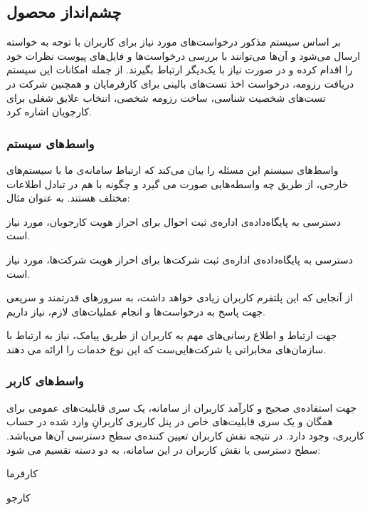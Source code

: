 \documentclass[12pt,svgnames,oneside]{book}
\newcounter{itemadded}
\let\LaTeXStandardEnumerateBegin\enumerate
\let\LaTeXStandardEnumerateEnd\endenumerate
\renewenvironment{enumerate}{%
\LaTeXStandardEnumerateBegin%
\setcounter{itemadded}{0}
}{%
\LaTeXStandardEnumerateEnd%
}%
\begin{document}
\subsection{چشم‌انداز محصول}
بر اساس سیستم مذکور درخواست‌های مورد نیاز برای کاربران با توجه به خواسته ارسال می‌شود و آن‌ها می‌توانند با بررسی درخواست‌ها و فایل‌های پیوست نظرات خود را اقدام کرده و در صورت نیاز با یک‌دیگر ارتباط بگیرند.
از جمله امکانات این سیستم دریافت رزومه، درخواست اخذ تست‌های بالینی برای کارفرمایان و همچنین شرکت در تست‌های شخصیت شناسی، ساخت رزومه شخصی، انتخاب علایق شغلی برای کارجویان اشاره کرد.

\subsubsection{واسط‌های سیستم}
واسط‌های سیستم این مسئله را بیان می‌کند که ارتباط سامانه‌ی ما با سیستم‌های خارجی، از طریق چه واسطه‌هایی صورت می گیرد و چگونه با هم در تبادل اطلاعات مختلف هستند. به عنوان مثال:
\begin{enumerate}
\item
	دسترسی به پایگاه‌داده‌ی اداره‌ی ثبت احوال برای احراز هویت کارجو‌یان، مورد نیاز است.
\item
	دسترسی به پایگاه‌داده‌ی اداره‌ی ثبت شرکت‌ها برای احراز هویت شرکت‌ها، مورد نیاز است.
\item
	از آنجایی که این پلتفرم کاربران زیادی خواهد داشت، به سرور‌های قدرتمند و سریعی جهت پاسخ به درخواست‌ها و انجام عملیات‌های لازم، نیاز داریم.
\item
	جهت ارتباط و اطلاع رسانی‌های مهم به کاربران از طریق پیامک، نیاز به ارتباط با سازمان‌های مخابراتی یا شرکت‌هایی‌ست که این نوع خدمات را ارائه می دهند.
\end{enumerate}

\subsubsection{واسط‌های کاربر}
جهت استفاده‌ی صحیح و کارآمد کاربران از سامانه، یک سری قابلیت‌های عمومی برای همگان و یک سری قابلیت‌های خاص در پنل کاربری کاربرانِ وارد شده در حساب کاربری، وجود دارد. در نتیجه نقش کاربران تعیین کننده‌ی سطح دسترسی آن‌ها می‌باشد. سطح‌ دسترسی یا نقش کاربران در این سامانه، به دو دسته تقسیم می شود:
\begin{enumerate}
\item
 کارفرما
\item
 کارجو
\end{enumerate}
\end{document}

